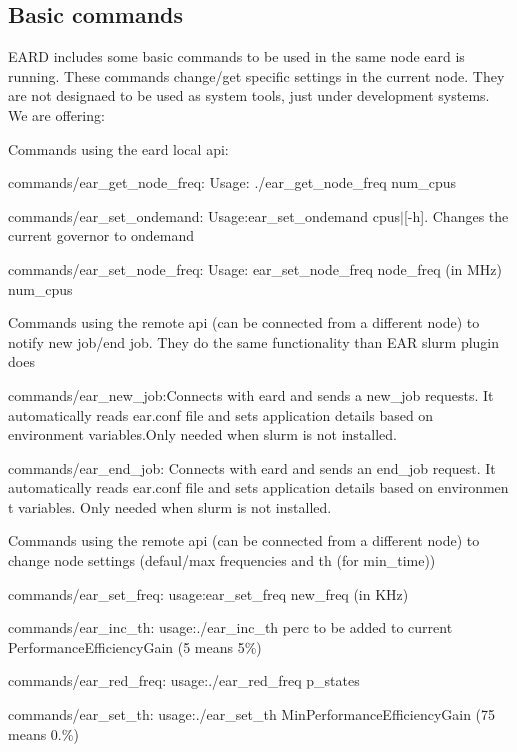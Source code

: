 \subsection*{Basic commands }

E\+A\+RD includes some basic commands to be used in the same node eard is running. These commands change/get specific settings in the current node. They are not designaed to be used as system tools, just under development systems. We are offering\+:


\begin{DoxyEnumerate}
\item Commands using the eard local api\+:
\begin{DoxyItemize}
\item commands/ear\+\_\+get\+\_\+node\+\_\+freq\+: Usage\+: ./ear\+\_\+get\+\_\+node\+\_\+freq num\+\_\+cpus
\item commands/ear\+\_\+set\+\_\+ondemand\+: Usage\+:ear\+\_\+set\+\_\+ondemand cpus$\vert$\mbox{[}-\/h\mbox{]}. Changes the current governor to ondemand
\item commands/ear\+\_\+set\+\_\+node\+\_\+freq\+: Usage\+: ear\+\_\+set\+\_\+node\+\_\+freq node\+\_\+freq (in M\+Hz) num\+\_\+cpus
\end{DoxyItemize}
\item Commands using the remote api (can be connected from a different node) to notify new job/end job. They do the same functionality than E\+AR slurm plugin does
\begin{DoxyItemize}
\item commands/ear\+\_\+new\+\_\+job\+:Connects with eard and sends a new\+\_\+job requests. It automatically reads ear.\+conf file and sets application details based on environment variables.\+Only needed when slurm is not installed.
\item commands/ear\+\_\+end\+\_\+job\+: Connects with eard and sends an end\+\_\+job request. It automatically reads ear.\+conf file and sets application details based on environmen t variables. Only needed when slurm is not installed.
\end{DoxyItemize}
\item Commands using the remote api (can be connected from a different node) to change node settings (defaul/max frequencies and th (for min\+\_\+time))
\begin{DoxyItemize}
\item commands/ear\+\_\+set\+\_\+freq\+: usage\+:ear\+\_\+set\+\_\+freq new\+\_\+freq (in K\+Hz)
\item commands/ear\+\_\+inc\+\_\+th\+: usage\+:./ear\+\_\+inc\+\_\+th perc to be added to current Performance\+Efficiency\+Gain (5 means 5\%)
\item commands/ear\+\_\+red\+\_\+freq\+: usage\+:./ear\+\_\+red\+\_\+freq p\+\_\+states
\item commands/ear\+\_\+set\+\_\+th\+: usage\+:./ear\+\_\+set\+\_\+th Min\+Performance\+Efficiency\+Gain (75 means 0.\%)
\end{DoxyItemize}
\end{DoxyEnumerate}

